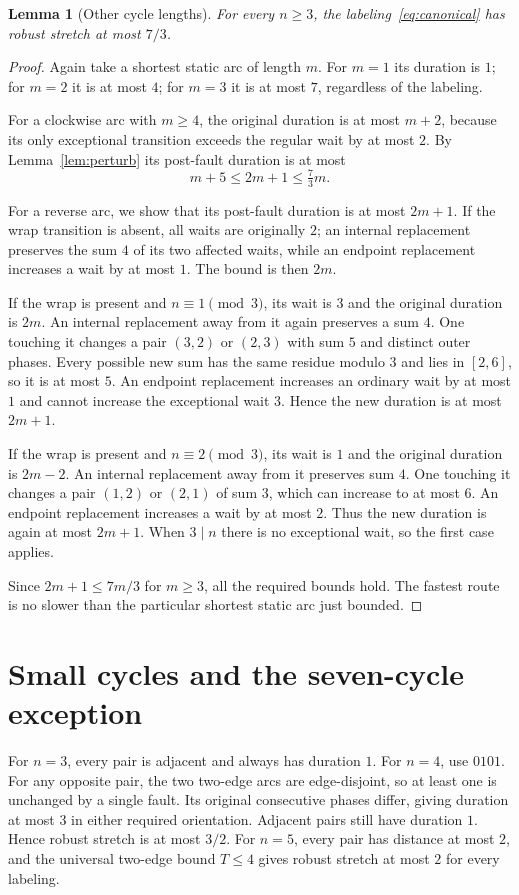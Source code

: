 \documentclass[11pt,a4paper]{article}
\newtheorem{lemma}{Lemma}
\begin{document}
\begin{lemma}[Other cycle lengths]\label{lem:upper73}
For every $n\ge3$, the labeling~\eqref{eq:canonical} has robust stretch at most $7/3$.
\end{lemma}
\begin{proof}
Again take a shortest static arc of length $m$. For $m=1$ its duration is $1$; for $m=2$ it is at most $4$; for $m=3$ it is at most $7$, regardless of the labeling.

For a clockwise arc with $m\ge4$, the original duration is at most $m+2$, because its only exceptional transition exceeds the regular wait by at most $2$. By Lemma~\ref{lem:perturb} its post-fault duration is at most
\[
 m+5\le2m+1\le\tfrac73m.
\]

For a reverse arc, we show that its post-fault duration is at most $2m+1$. If the wrap transition is absent, all waits are originally $2$; an internal replacement preserves the sum $4$ of its two affected waits, while an endpoint replacement increases a wait by at most $1$. The bound is then $2m$.

If the wrap is present and $n\equiv1\pmod3$, its wait is $3$ and the original duration is $2m$. An internal replacement away from it again preserves a sum $4$. One touching it changes a pair $(3,2)$ or $(2,3)$ with sum $5$ and distinct outer phases. Every possible new sum has the same residue modulo $3$ and lies in $[2,6]$, so it is at most $5$. An endpoint replacement increases an ordinary wait by at most $1$ and cannot increase the exceptional wait $3$. Hence the new duration is at most $2m+1$.

If the wrap is present and $n\equiv2\pmod3$, its wait is $1$ and the original duration is $2m-2$. An internal replacement away from it preserves sum $4$. One touching it changes a pair $(1,2)$ or $(2,1)$ of sum $3$, which can increase to at most $6$. An endpoint replacement increases a wait by at most $2$. Thus the new duration is again at most $2m+1$. When $3\mid n$ there is no exceptional wait, so the first case applies.

Since $2m+1\le7m/3$ for $m\ge3$, all the required bounds hold. The fastest route is no slower than the particular shortest static arc just bounded.
\end{proof}

\section{Small cycles and the seven-cycle exception}
For $n=3$, every pair is adjacent and always has duration $1$. For $n=4$, use $0101$. For any opposite pair, the two two-edge arcs are edge-disjoint, so at least one is unchanged by a single fault. Its original consecutive phases differ, giving duration at most $3$ in either required orientation. Adjacent pairs still have duration $1$. Hence robust stretch is at most $3/2$. For $n=5$, every pair has distance at most $2$, and the universal two-edge bound $T\le4$ gives robust stretch at most $2$ for every labeling.
\end{document}
